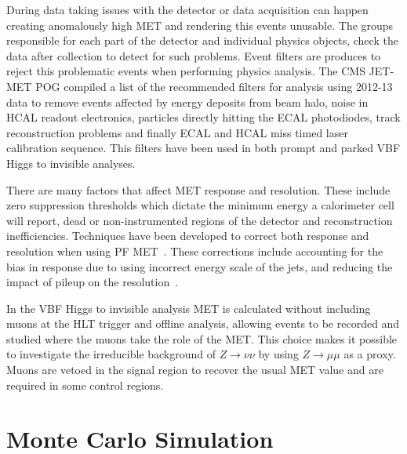 During data taking issues with the detector or data acquisition can happen creating anomalously high \gls{MET} and rendering this events unusable. The groups responsible for each part of the detector and individual physics objects, check the data after collection to detect for such problems. Event filters are produces to reject this problematic events when performing physics analysis.  The \gls{CMS} JET-MET \gls{POG} compiled a list of the recommended filters for analysis using 2012-13 data to remove events affected by energy deposits from beam halo, noise in \gls{HCAL} readout electronics, particles directly hitting the \gls{ECAL} photodiodes, track reconstruction problems and finally \gls{ECAL} and \gls{HCAL} miss timed laser calibration sequence. This filters have been used in both prompt and parked \gls{VBF} Higgs to invisible analyses.

There are many factors that affect \gls{MET} response and resolution. These include zero suppression thresholds which dictate the minimum energy a calorimeter cell will report, dead or non-instrumented regions of the detector and reconstruction inefficiencies. Techniques have been developed to correct both response and resolution when using \gls{PF} \gls{MET}~\cite{ARTICLE:CMSMissingTransverseEnergyPerformance}. These corrections include accounting for the bias in response due to using incorrect energy scale of the jets, and reducing the impact of pileup on the resolution~\cite{ARTICLE:CMSMETPerformance8TeV}.

In the \gls{VBF} Higgs to invisible analysis \gls{MET} is calculated without including muons at the \gls{HLT} trigger and offline analysis, allowing events to be recorded and studied where the muons take the role of the \gls{MET}. This choice makes it possible to investigate the irreducible background of $Z \rightarrow \nu\nu$ by using $Z \rightarrow \mu\mu$ as a proxy. Muons are vetoed in the signal region to recover the usual \gls{MET} value and are required in some control regions.


\section{Monte Carlo Simulation}
\label{SECTION:EventReconstructionAndSimulation_MonteCarloSimulation}

